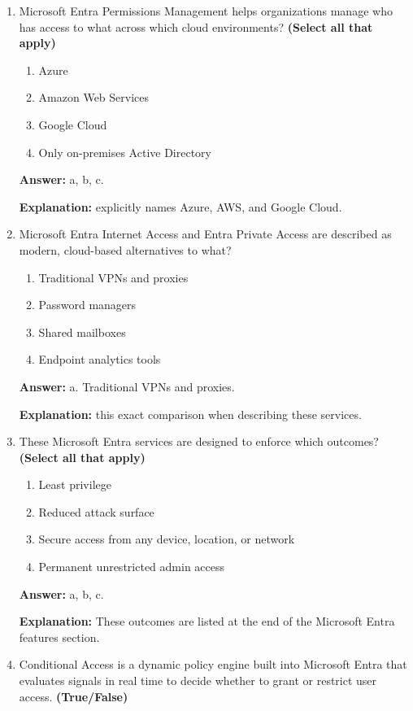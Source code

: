 \documentclass[10pt]{article}
\begin{document}
\begin{enumerate}[leftmargin=*]
\item Microsoft Entra Permissions Management helps organizations manage who has access to what across which cloud environments? \textbf{(Select all that apply)}
\begin{enumerate}[label=\alph*., leftmargin=1.5em]
\item Azure
\item Amazon Web Services
\item Google Cloud
\item Only on-premises Active Directory
\end{enumerate}
\textbf{Answer:} a, b, c.

\textbf{Explanation:} explicitly names Azure, AWS, and Google Cloud.

\item Microsoft Entra Internet Access and Entra Private Access are described as modern, cloud-based alternatives to what?
\begin{enumerate}[label=\alph*., leftmargin=1.5em]
\item Traditional VPNs and proxies
\item Password managers
\item Shared mailboxes
\item Endpoint analytics tools
\end{enumerate}
\textbf{Answer:} a. Traditional VPNs and proxies.

\textbf{Explanation:} this exact comparison when describing these services.

\item These Microsoft Entra services are designed to enforce which outcomes? \textbf{(Select all that apply)}
\begin{enumerate}[label=\alph*., leftmargin=1.5em]
\item Least privilege
\item Reduced attack surface
\item Secure access from any device, location, or network
\item Permanent unrestricted admin access
\end{enumerate}
\textbf{Answer:} a, b, c.

\textbf{Explanation:} These outcomes are listed at the end of the Microsoft Entra features section.

\item Conditional Access is a dynamic policy engine built into Microsoft Entra that evaluates signals in real time to decide whether to grant or restrict user access. \textbf{(True/False)}


\end{enumerate}
\end{document}
